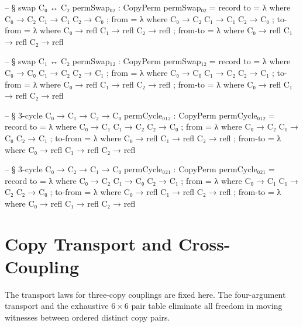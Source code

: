 \documentclass[11pt,a4paper]{book}
\begin{document}
\begin{code}
-- § swap C₀ ↔ C₂
permSwap₀₂ : CopyPerm
permSwap₀₂ = record
  { to = λ where
      C₀ → C₂
      C₁ → C₁
      C₂ → C₀
  ; from = λ where
      C₀ → C₂
      C₁ → C₁
      C₂ → C₀
  ; to-from = λ where
      C₀ → refl
      C₁ → refl
      C₂ → refl
  ; from-to = λ where
      C₀ → refl
      C₁ → refl
      C₂ → refl
  }

-- § swap C₁ ↔ C₂
permSwap₁₂ : CopyPerm
permSwap₁₂ = record
  { to = λ where
      C₀ → C₀
      C₁ → C₂
      C₂ → C₁
  ; from = λ where
      C₀ → C₀
      C₁ → C₂
      C₂ → C₁
  ; to-from = λ where
      C₀ → refl
      C₁ → refl
      C₂ → refl
  ; from-to = λ where
      C₀ → refl
      C₁ → refl
      C₂ → refl
  }

-- § 3-cycle C₀ → C₁ → C₂ → C₀
permCycle₀₁₂ : CopyPerm
permCycle₀₁₂ = record
  { to = λ where
      C₀ → C₁
      C₁ → C₂
      C₂ → C₀
  ; from = λ where
      C₀ → C₂
      C₁ → C₀
      C₂ → C₁
  ; to-from = λ where
      C₀ → refl
      C₁ → refl
      C₂ → refl
  ; from-to = λ where
      C₀ → refl
      C₁ → refl
      C₂ → refl
  }

-- § 3-cycle C₀ → C₂ → C₁ → C₀
permCycle₀₂₁ : CopyPerm
permCycle₀₂₁ = record
  { to = λ where
      C₀ → C₂
      C₁ → C₀
      C₂ → C₁
  ; from = λ where
      C₀ → C₁
      C₁ → C₂
      C₂ → C₀
  ; to-from = λ where
      C₀ → refl
      C₁ → refl
      C₂ → refl
  ; from-to = λ where
      C₀ → refl
      C₁ → refl
      C₂ → refl
  }
\end{code}

\section{Copy Transport and Cross-Coupling}

The transport laws for three-copy couplings are fixed here.
The four-argument transport and the exhaustive $6 \times 6$ pair table eliminate
all freedom in moving witnesses between ordered distinct copy pairs.
\end{document}
